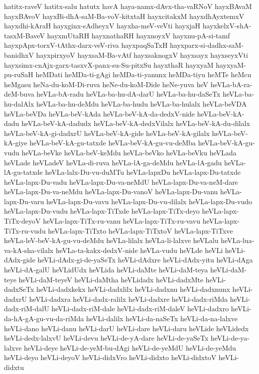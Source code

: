 {hatitx-raveV
hatitx-salu
hatutx
havA
haya-namx-dAvx-tha-vaRNoV
hayxBAvaM
hayxBAvoV
hayxBi-dhA-saM-Ba-voV-kitxtaH
hayxcitakxM
hayxdhAyxtemxV
hayxdhi-kAraH
hayxginx-sAdheyxV
hayxha-meV-veVti
hayxjaH
hayxkelxV-shA-tasxM-BaveV
hayxmUtaRH
hayxnathaRH
hayxnoyxV
hayxnu-pA-si-tamf
hayxpApx-torxV-tAthx-darx-veV-riva
hayxpaqSaTxH
hayxparx-si-dadhx-saM-banidhxV
hayxpirxyoV
hayxsaM-Ba-vAtf
hayxsaknogxV
hayxsayx
hayxseyxVti
hayxsimx-cnAjx-garx-tasxvX-panx-su-Su-pitxSu
hayxthaR
hayxyaM
hayxyaM-pu-ruSaH
heMDati
heMDa-ti-gAgi
heMDa-ti-yanunx
heMDa-tiyu
heMTe
heMcu
heMgasu
heNa-du-koM-Di-ruva
heNe-du-koM-Dide
heNe-yuva
heV
heVLa-bA-ra-deM-buva
heVLa-bA-radu
heVLa-ba-hu-dA-darU
heVLa-ba-hu-daSeTx
heVLa-ba-hu-dalAlx
heVLa-ba-hu-deMdu
heVLa-ba-hudu
heVLa-ba-hulalx
heVLa-beVDA
heVLa-beVDa
heVLa-beV-kAda
heVLa-beV-kA-da-dedxV-nide
heVLa-beV-kA-dadu
heVLa-beV-kA-dadudx
heVLa-beV-kA-dedxVilalx
heVLa-beV-kA-du-dilalx
heVLa-beV-kA-gi-dadxrU
heVLa-beV-kA-gide
heVLa-beV-kA-gilalx
heVLa-beV-kA-giye
heVLa-beV-kA-gu-tatxde
heVLa-beV-kA-gu-vu-deMba
heVLa-beV-kA-gu-vudu
heVLa-beVke
heVLa-beV-keMdu
heVLa-beVko
heVLa-beVku
heVLada
heVLade
heVLadeV
heVLa-di-ruva
heVLa-lA-ga-deMdu
heVLa-lA-gadu
heVLa-lA-gu-tatxde
heVLa-lalx-Du-vu-duMTu
heVLa-lapxDu
heVLa-lapx-Du-tatxde
heVLa-lapx-Du-vadu
heVLa-lapx-Du-va-neMdU
heVLa-lapx-Du-va-neM-dare
heVLa-lapx-Du-va-neMdu
heVLa-lapx-Du-vanoV
heVLa-lapx-Du-vanu
heVLa-lapx-Du-varu
heVLa-lapx-Du-vavu
heVLa-lapx-Du-vu-dilalx
heVLa-lapx-Du-vudo
heVLa-lapx-Du-vudu
heVLa-lapx-TiTxde
heVLa-lapx-TiTx-deyo
heVLa-lapx-TiTx-deyoV
heVLa-lapx-TiTx-ru-vanu
heVLa-lapx-TiTx-ru-vavu
heVLa-lapx-TiTx-ru-vudu
heVLa-lapx-TiTxto
heVLa-lapx-TiTxtoV
heVLa-lapx-TiTxve
heVLa-leV-beV-kA-gu-vu-deMdu
heVLa-lilalx
heVLa-li-lalxve
heVLalu
heVLa-lua-va-kA-sha-vilalx
heVLa-ta-kakx-dedxV-nide
heVLa-vudu
heVLde
heVLi
heVLi-dAdx-gide
heVLi-dAdx-gi-de-yaSeTx
heVLi-dAdxre
heVLi-dAdx-yitu
heVLi-dAga
heVLi-dA-galU
heVLidUdx
heVLida
heVLi-daMte
heVLi-daM-teya
heVLi-daM-teye
heVLi-daM-teyeV
heVLi-daMtha
heVLidadx
heVLi-dadxMte
heVLi-dadxSeTx
heVLi-dadxkekx
heVLi-dadxlilx
heVLi-dadxnu
heVLi-dadxnunx
heVLi-dadxrU
heVLi-dadxra
heVLi-dadx-ralilx
heVLi-dadxre
heVLi-dadx-riMda
heVLi-dadx-riM-dalU
heVLi-dadx-riM-dale
heVLi-dadx-riM-daleV
heVLi-dadxro
heVLi-da-hA-gA-gu-vu-da-riMda
heVLi-dalilx
heVLi-da-naSeTx
heVLi-da-na-lalxve
heVLi-dano
heVLi-danu
heVLi-darU
heVLi-dare
heVLi-daru
heVLide
heVLidedx
heVLi-dedx-lalxvU
heVLi-devu
heVLi-de-yA-dare
heVLi-de-yaSeTx
heVLi-de-ya-lalxve
heVLi-deye
heVLi-de-yeM-bu-dAgi
heVLi-de-yeMdU
heVLi-de-yeMdu
heVLi-deyo
heVLi-deyoV
heVLi-didxVro
heVLi-didxto
heVLi-didxtoV
heVLi-didxtu
}
